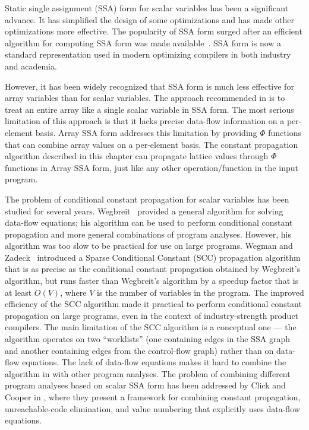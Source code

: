 Static single assignment (SSA) form for scalar variables has been a significant
advance.  It has simplified the design of some optimizations and has made
other optimizations more effective.  
The popularity of SSA form surged
after an efficient algorithm for computing SSA form was made available~\cite{CFRWZ91a}.  SSA form is now a standard representation used in modern
optimizing compilers in both industry and academia.

However, it has been widely recognized that SSA form is much less
effective for array variables than for scalar variables.
The approach recommended in \cite{CFRWZ91a} is to treat an
entire array like a single scalar variable in SSA form.
The most serious limitation of this approach is that it lacks precise
data-flow information on a per-element basis.
Array SSA form addresses this limitation by providing $\Phi$
functions that can combine array values on a per-element basis.
The constant propagation algorithm described in this
chapter can  propagate lattice values through $\Phi$ functions 
in Array SSA form,
just
like any other operation/function in the input program.

The problem of conditional constant propagation for 
scalar variables 
has been
studied for several years.  Wegbreit~\cite{Wegb75} provided a general
algorithm for solving data-flow equations; his algorithm
can be used to perform conditional constant propagation and
more general combinations of program analyses.
However, his algorithm was too slow to be practical for use on 
large programs.
Wegman and Zadeck~\cite{WeZa91} introduced a Sparse Conditional
Constant (SCC) propagation algorithm that is as precise as the conditional
constant propagation obtained by Wegbreit's algorithm, but runs faster
than Wegbreit's algorithm by a speedup factor that is at least $O(V)$,
where $V$ is the number of variables in the program.  
The improved efficiency of the SCC algorithm made it practical to
perform conditional constant propagation on large programs, even in the
context of industry-strength product compilers.  The main limitation
of the SCC algorithm is a conceptual one --- the algorithm operates
on two ``worklists''
(one containing edges in the SSA graph and another
containing edges from the control-flow graph)
rather than on data-flow equations.  The lack of
data-flow equations
makes it hard to combine the algorithm in \cite{WeZa91}
with other program analyses.
The problem  of combining different program analyses based on
scalar SSA form has been addressed by Click and
Cooper in \cite{ClCo95}, where they present a framework for 
combining constant propagation, unreachable-code elimination,
and value numbering that explicitly uses data-flow equations.

